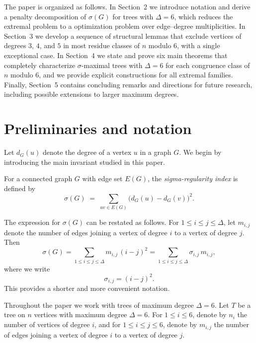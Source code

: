 \documentclass[preprint,12pt]{elsarticle}
\begin{document}
The paper is organized as follows. 
In Section~2 we introduce notation and derive a penalty decomposition of 
$\sigma(G)$ for trees with $\Delta=6$, which reduces the extremal problem to a 
 optimization problem over edge–degree multiplicities. 
In Section~3 we develop a sequence of structural lemmas that exclude vertices of 
degrees $3$, $4$, and $5$ in most residue classes of $n$ modulo $6$, with a single 
exceptional case. 
In Section~4 we state and prove six main theorems that completely characterize 
$\sigma$-maximal trees with $\Delta=6$ for each congruence class of $n$ modulo $6$, 
and we provide explicit constructions for all extremal families. 
Finally, Section~5 contains concluding remarks and directions for future 
research, including possible extensions to larger maximum degrees.








\section{Preliminaries and notation}
\label{sec:prelim}

Let $d_G(u)$ denote the degree of a vertex $u$ in a graph $G$.
We begin by introducing the main invariant studied in this paper.

\begin{definition}
\label{def:sigma}
For a connected graph $G$ with edge set $E(G)$, the \emph{sigma-regularity index}
is defined by
\begin{equation}
\label{eq:def_sigma}
\sigma(G)\;=\;\sum_{uv\in E(G)}\bigl(d_G(u)-d_G(v)\bigr)^2.
\end{equation}
\end{definition}

The expression for $\sigma(G)$ can be restated as follows. For $1\le i\le j\le \Delta$,
let $m_{i,j}$ denote the number of edges joining a vertex of degree $i$ to a vertex
of degree $j$. Then
\[
\sigma(G)
=\sum_{1\le i\le j\le \Delta} m_{i,j}\,(i-j)^2
=\sum_{1\le i\le j\le \Delta}\sigma_{i,j}\,m_{i,j},
\]
where we write
\[
\sigma_{i,j}=(i-j)^2.
\]
This provides a shorter and more convenient notation.

\medskip
Throughout the paper we work with trees of maximum degree $\Delta=6$.
Let $T$ be a tree on $n$ vertices with maximum degree $\Delta=6$.
For $1\le i\le 6$, denote by $n_i$ the number of vertices of degree $i$, and for
$1\le i\le j\le 6$, denote by $m_{i,j}$ the number of edges joining a vertex
of degree $i$ to a vertex of degree $j$.
\end{document}

